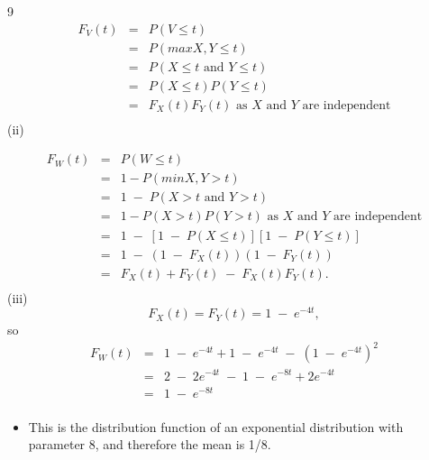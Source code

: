 \documentclass[a4paper,12pt]{article}
\begin{document}



9
\begin{eqnarray*}
F_V (t) &=& P(V \leq  t) \\ 
&=& P(max {X, Y} \leq  t)\\
&=& P(X \leq  t \mbox{ and } Y \leq  t) \\ 
&=& P(X \leq  t) P(Y \leq  t) \\ 
&=& F_X (t)F_Y (t)  \mbox{ as } X \mbox{ and } Y \mbox{ are independent} \\
\end{eqnarray*}
(ii)

\begin{eqnarray*}
F_W (t) &=& P(W \leq  t) \\
&=& 1 - P(min{X, Y} > t)\\
&=& 1 \; - \; P(X > t \mbox{ and } Y > t)\\
&=& 1 - P(X > t) P(Y > t) \mbox{ as } X \mbox{ and } Y \mbox{ are independent} \\
&=& 1 \; - \; [1 \; - \; P(X \leq  t)] [1 \; - \; P(Y \leq  t)]\\
&=& 1 \; - \; (1 \; - \; F_X (t)) (1 \; - \; F_Y (t))\\
&=& F_X (t) + F_Y (t) \; - \; F_X (t)F_Y (t) .\\
\end{eqnarray*}
(iii)
\[F_X (t) = F_Y (t) = 1 \; - \; e^{-4t} ,\] so
\begin{eqnarray*}
F_W (t) &=& 1 \; - \; e^{-4t} + 1 \; - \; e^{-4t} \; - \; (1 \; - \; e^{-4t} )^2\\
&=& 2 \; - \; 2e^{-4t} \; - \; 1 \; - \; e^{-8t} + 2e^{-4t}\\
&=& 1 \; - \; e^{-8t}\\
\end{eqnarray*}
\begin{itemize}

\item

This is the distribution function of an exponential distribution with parameter 8, and
therefore the mean is 1/8.
\end{itemize}
\end{document}
